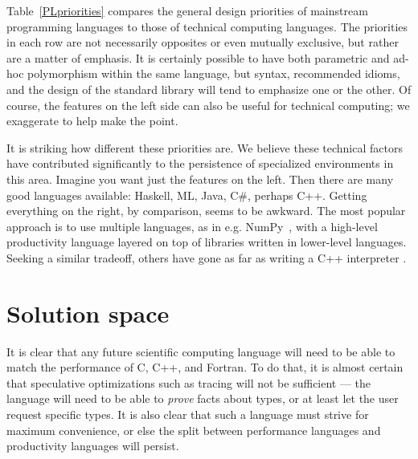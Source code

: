 Table~\ref{PLpriorities} compares the general design priorities of mainstream
programming languages to those of technical computing languages.
The priorities in each row are not necessarily opposites or even mutually exclusive,
but rather are a matter of emphasis.
It is certainly possible to have both parametric and ad-hoc polymorphism within
the same language, but syntax, recommended idioms, and the design of the standard
library will tend to emphasize one or the other.
Of course, the features on the left side can also be useful for technical computing;
we exaggerate to help make the point.

It is striking how different these priorities are.
We believe these technical factors have contributed significantly to the persistence
of specialized environments in this area.
Imagine you want just the features on the left.
Then there are many good languages available: Haskell, ML, Java, C\#, perhaps C++.
Getting everything on the right, by comparison, seems to be awkward.
The most popular approach is to use multiple languages, as in e.g. NumPy~\cite{numpy},
with a high-level productivity language layered on top of libraries
written in lower-level languages.
Seeking a similar tradeoff, others have gone as far as writing a C++
interpreter \cite{vasilev2012cling}.




\section{Solution space}

It is clear that any future scientific computing language will need to be able to
match the performance of C, C++, and Fortran.
To do that, it is almost certain that speculative optimizations such as tracing
\cite{tracingjit} will not be sufficient ---
the language will need to be able to \emph{prove} facts about types, or at least
let the user request specific types.
It is also clear that such a language must strive for maximum convenience, or else
the split between performance languages and productivity languages will persist.

